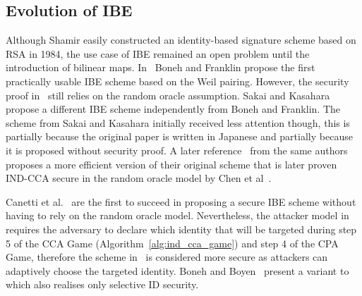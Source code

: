 
\subsection{Evolution of IBE}
\label{sec:evolution_of_ibe}
Although Shamir easily constructed an identity-based signature scheme based on RSA in 1984, the use case of IBE remained an open problem until the introduction of bilinear maps. In~\cite{art:BonehF01} Boneh and Franklin propose the first practically usable IBE scheme based on the Weil pairing. However, the security proof in~\cite{art:BonehF01} still relies on the random oracle assumption. Sakai and Kasahara~\cite{art:SakaiOK01} propose a different IBE scheme independently from Boneh and Franklin. The scheme from Sakai and Kasahara initially received less attention though, this is partially because the original paper is written in Japanese and partially because it is proposed without security proof. A later reference~\cite{art:SakaiK03} from the same authors proposes a more efficient version of their original scheme that is later proven IND-CCA secure in the random oracle model by Chen et al~\cite{art:ChenC05}. 

Canetti et al.~\cite{art:CanettiHK03} are the first to succeed in proposing a secure IBE scheme without having to rely on the random oracle model. Nevertheless, the attacker model in~\cite{art:CanettiHK03} requires the adversary to declare which identity \id{} that will be targeted during step 5 of the CCA Game (Algorithm~\ref{alg:ind_cca_game}) and step 4 of the CPA Game, therefore the scheme in~\cite{art:BonehF01} is considered more secure as attackers can adaptively choose the targeted identity. Boneh and Boyen~\cite{art:BonehB04} present a variant to~\cite{art:CanettiHK03} which also realises only selective ID security.

